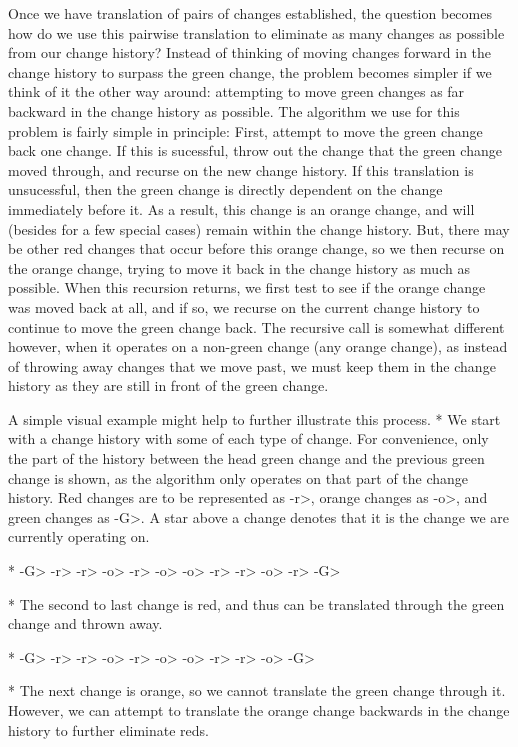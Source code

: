 \documentclass{article}
\begin{document}
Once we have translation of pairs of changes established, 
the question becomes how do we use this pairwise translation 
to eliminate as many changes 
as possible from our change history? 
Instead of thinking of moving changes 
forward in the change history 
to surpass the green change, 
the problem becomes simpler 
if we think of it the other way around: 
attempting to move green changes 
as far backward 
in the change history as possible. 
The algorithm we use for this problem 
is fairly simple in principle: 
First, attempt to move the green change back one change. 
If this is sucessful, 
throw out the change that the green change moved through, 
and recurse on the new change history. 
If this translation is unsucessful, 
then the green change is directly dependent 
on the change immediately before it. 
As a result, 
this change is an orange change, 
and will (besides for a few special cases) 
remain within the change history. 
But, there may be other 
red changes that occur before this orange change, 
so we then recurse on the orange change, 
trying to move it back in the change history 
as much as possible. 
When this recursion returns, 
we first test to see if the orange change 
was moved back at all, 
and if so, 
we recurse on the current change history 
to continue to move the green change back. 
The recursive call is somewhat different however, 
when it operates on a non-green change (any orange change), 
as instead of throwing away changes 
that we move past, 
we must keep them in the change history 
as they are still in front of the green change.

A simple visual example 
might help to further illustrate this process.
* We start with a change history 
with some of each type of change. 
For convenience, 
only the part of the history 
between the head green change 
and the previous green change 
is shown, 
as the algorithm only operates 
on that part of the 
change history. 
Red changes are to be represented as -r>, 
orange changes as -o>, 
and green changes as -G>. 
A star above a change denotes 
that it is the change we are currently operating on.

     	   	  	 	      	     *
-G> -r> -r> -o> -r> -o> -o> -r> -r> -o> -r> -G>


* The second to last change is red, 
and thus can be translated 
through the green change 
and thrown away.

      	     	     	       	    	 *
-G> -r> -r> -o> -r> -o> -o> -r> -r> -o> -G>


* The next change is orange, 
so we cannot translate the green change 
through it. 
However, we can attempt 
to translate the orange change 
backwards in the change history 
to further eliminate reds.
\end{document}
